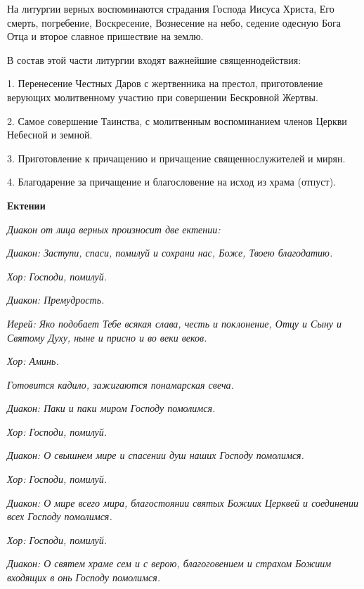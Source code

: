 На литургии верных воспоминаются страдания Господа Иисуса Христа, Его смерть, погребение, Воскресение, Вознесение на небо, седение одесную Бога Отца и второе славное пришествие на землю.


В состав этой части литургии входят важнейшие священнодействия:



1. Перенесение Честных Даров с жертвенника на престол, приготовление верующих молитвенному участию при совершении Бескровной Жертвы.


2. Самое совершение Таинства, с молитвенным воспоминанием членов Церкви Небесной и земной.


3. Приготовление к причащению и причащение священнослужителей и мирян.


4. Благодарение за причащение и благословение на исход из храма (отпуст).






\bfseries Ектении\normalfont{}


\itshape Диакон от лица верных произносит две ектении:\normalfont{}


\itshape Диакон:\normalfont{} Заступи, спаси, помилуй и сохрани нас, Боже, Твоею благодатию.


\itshape Хор:\normalfont{} Господи, помилуй.


\itshape Диакон:\normalfont{} Премудрость.


\itshape Иерей:\normalfont{} Яко подобает Тебе всякая слава, честь и поклонение, Отцу и Сыну и Святому Духу, ныне и присно и во веки веков.


\itshape Хор:\normalfont{} Аминь.


\itshape Готовится кадило, зажигаются понамарская свеча.\normalfont{}


\itshape Диакон:\normalfont{} Паки и паки миром Господу помолимся.


\itshape Хор:\normalfont{} Господи, помилуй.


\itshape Диакон:\normalfont{} О свышнем мире и спасении душ наших Господу помолимся.


\itshape Хор:\normalfont{} Господи, помилуй.


\itshape Диакон:\normalfont{} О мире всего мира, благостоянии святых Божиих Церквей и соединении всех Господу помолимся.


\itshape Хор:\normalfont{} Господи, помилуй.


\itshape Диакон:\normalfont{} О святем храме сем и с верою, благоговением и страхом Божиим входящих в онь Господу помолимся.


